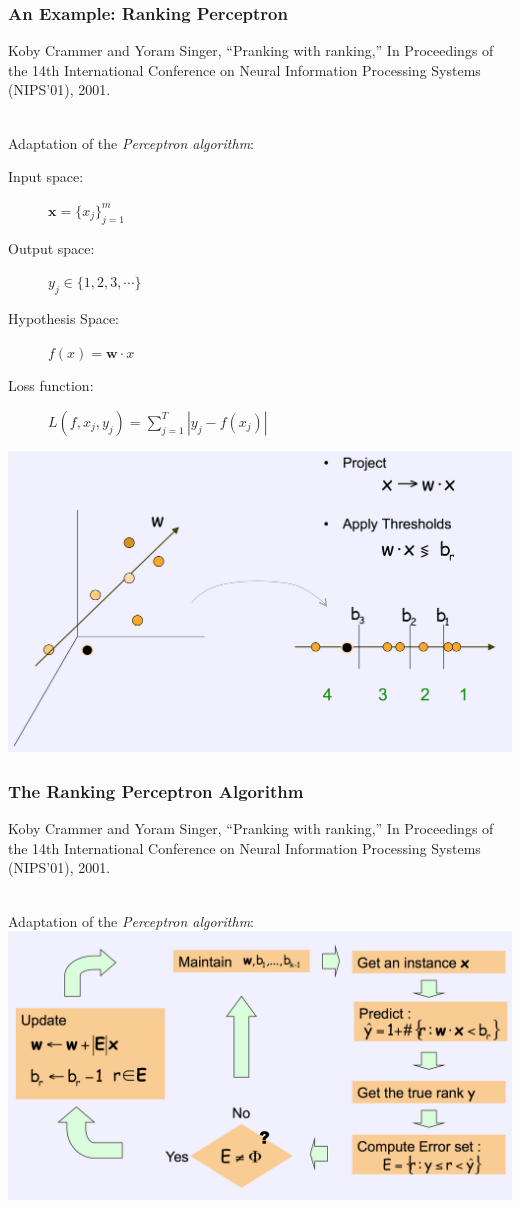 \documentclass{beamer}
\begin{document}
\begin{frame}
    \frametitle{An Example: Ranking Perceptron}
    \begin{minipage}{1.0\linewidth}
        \footnotesize Koby Crammer and Yoram Singer, ``Pranking with ranking,''
        In Proceedings of the 14th International Conference on Neural
        Information Processing Systems (NIPS'01), 2001.
    \end{minipage}\\[\baselineskip]

    Adaptation of the \textit{Perceptron algorithm}:
    \vfill
    \begin{description}
    \item[Input space:] $\mathbf{x} = \{x_j\}_{j=1}^m$
    \item[Output space:] $y_j \in \{1, 2, 3, \cdots \}$
    \item[Hypothesis Space:] $f(x) = \mathbf{w} \cdot x$
    \item[Loss function:] $L(f, x_j, y_j) = \sum_{j=1}^T|y_j - f(x_j)|$
    \end{description}
    \vfill
    \centering
    \includegraphics[width=.7\linewidth]{pranking}
\end{frame}

\begin{frame}
    \frametitle{The Ranking Perceptron Algorithm}
    \begin{minipage}{1.0\linewidth}
        \footnotesize Koby Crammer and Yoram Singer, ``Pranking with ranking,''
        In Proceedings of the 14th International Conference on Neural
        Information Processing Systems (NIPS'01), 2001.
    \end{minipage}\\[\baselineskip]
    Adaptation of the \textit{Perceptron algorithm}:
    \vfill
    \centering
    \includegraphics[width=.8\linewidth]{pranking2}
\end{frame}
\end{document}

